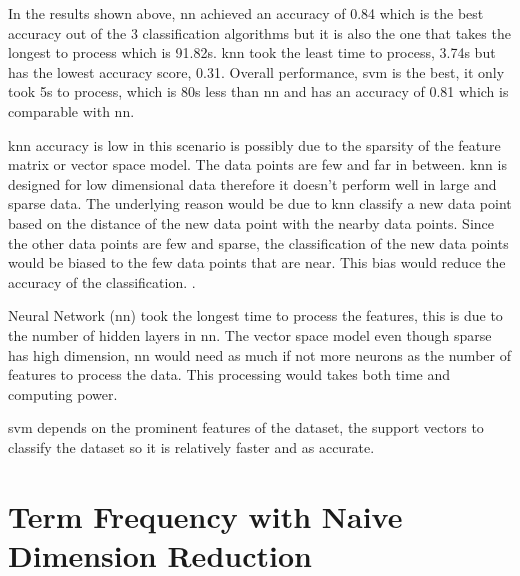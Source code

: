In the results shown above, \ac{nn} achieved an accuracy of 0.84 which is the best accuracy out of the 3 classification algorithms but it is also the one that takes the longest to process which is 91.82s. \Ac{knn} took the least time to process, 3.74s but has the lowest accuracy score, 0.31. Overall performance, \ac{svm} is the best, it only took 5s to process, which is 80s less than \ac{nn} and has an accuracy of 0.81 which is comparable with \ac{nn}. 

\Ac{knn} accuracy is low in this scenario is possibly due to the sparsity of the feature matrix or vector space model. The data points are few and far in between. \Ac{knn} is designed for low dimensional data therefore it doesn't perform well in large and sparse data. The underlying reason would be due to \ac{knn} classify a new data point based on the distance of the new data point with the nearby data points. Since the other data points are few and sparse, the classification of the new data points would be biased to the few data points that are near. This bias would reduce the accuracy of the classification. \cite{knnDrawback}.

Neural Network (\ac{nn}) took the longest time to process the features, this is due to the number of hidden layers in \ac{nn}. The vector space model even though sparse has high dimension, \ac{nn} would need as much if not more neurons as the number of features to process the data. This processing would takes both time and computing power.

\Ac{svm} depends on the prominent features of the dataset, the support vectors to classify the dataset so it is relatively faster and as accurate.\\

\section{Term Frequency with Naive Dimension Reduction}

